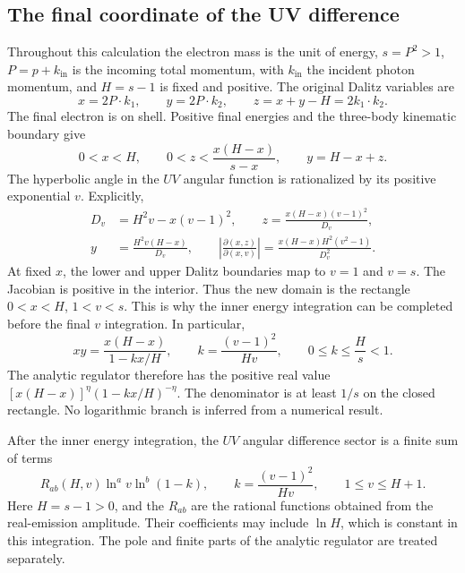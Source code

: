 \subsection{The final coordinate of the UV difference}
\label{sec:comp-uv-final-coordinate}
Throughout this calculation the electron mass is the unit of energy,
$s=P^2>1$, $P=p+k_{\mathrm{in}}$ is the incoming total momentum,
with $k_{\mathrm{in}}$ the incident photon momentum, and $H=s-1$ is
fixed and positive. The original Dalitz variables are
\begin{equation}
 x=2P\cdot k_1,\qquad y=2P\cdot k_2,\qquad
 z=x+y-H=2k_1\cdot k_2.
\end{equation}
The final electron is on shell. Positive final energies and the
three-body kinematic boundary give
\begin{equation}
 0<x<H,\qquad 0<z<\frac{x(H-x)}{s-x},\qquad y=H-x+z.
\end{equation}
The hyperbolic angle in the $UV$ angular function is rationalized by
its positive exponential $v$. Explicitly,
\begin{align}
 D_v&=H^2v-x(v-1)^2,\qquad
 z=\frac{x(H-x)(v-1)^2}{D_v},\\
 y&=\frac{H^2v(H-x)}{D_v},\qquad
 \left|\frac{\partial(x,z)}{\partial(x,v)}\right|
 =\frac{x(H-x)H^2(v^2-1)}{D_v^2}.
\end{align}
At fixed $x$, the lower and upper Dalitz boundaries map to $v=1$ and
$v=s$. The Jacobian is positive in the interior. Thus the new domain
is the rectangle $0<x<H$, $1<v<s$. This is why the inner energy
integration can be completed before the final $v$ integration.
In particular,
\begin{equation}
 xy=\frac{x(H-x)}{1-kx/H},\qquad k=\frac{(v-1)^2}{Hv},
 \qquad 0\leq k\leq\frac Hs<1.
\end{equation}
The analytic regulator therefore has the positive real value
$[x(H-x)]^\eta(1-kx/H)^{-\eta}$. The denominator is at least $1/s$
on the closed rectangle. No logarithmic branch is inferred from a
numerical result.

After the inner energy integration, the $UV$ angular difference sector
is a finite sum of terms
\begin{equation}
 R_{ab}(H,v)\ln^a v\ln^b(1-k),\qquad
 k=\frac{(v-1)^2}{Hv},\qquad 1\leq v\leq H+1.
\end{equation}
Here $H=s-1>0$, and the $R_{ab}$ are the rational functions obtained
from the real-emission amplitude. Their coefficients may include
$\ln H$, which is constant in this integration. The pole and finite
parts of the analytic regulator are treated separately.

